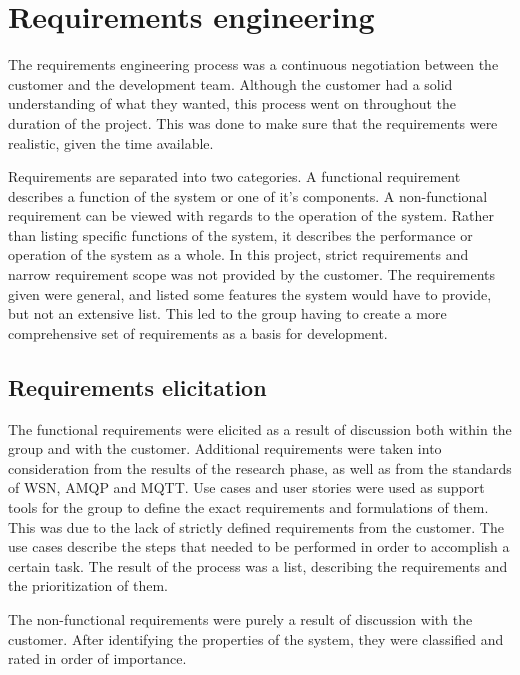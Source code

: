 
\chapter{Requirements engineering}
\label{ch:requirements_engineering}

The requirements engineering process was a continuous negotiation between the customer and the development team. Although the customer had a solid understanding of what they wanted, this process went on throughout the duration of the project. This was done to make sure that the requirements were realistic, given the time available.

Requirements are separated into two categories. A functional requirement describes a function of the system or one of it's components. A non-functional requirement can be viewed with regards to the operation of the system. Rather than listing specific functions of the system, it describes the performance or operation of the system as a whole. In this project, strict requirements and narrow requirement scope was not provided by the customer. The requirements given were general, and listed some features the system would have to provide, but not an extensive list. This led to the group having to create a more comprehensive set of requirements as a basis for development.

\section{Requirements elicitation}
\label{sec:requirements_engineering-requirements_elicitation}

The functional requirements were elicited as a result of discussion both within the group and with the customer. Additional requirements were taken into consideration from the results of the research phase, as well as from the standards of WSN, AMQP and MQTT. Use cases and user stories were used as support tools for the group to define the exact requirements and formulations of them. This was due to the lack of strictly defined requirements from the customer. The use cases describe the steps that needed to be performed in order to accomplish a certain task. The result of the process was a list, describing the requirements and the prioritization of them.

The non-functional requirements were purely a result of discussion with the customer. After identifying the properties of the system, they were classified and rated in order of importance.

